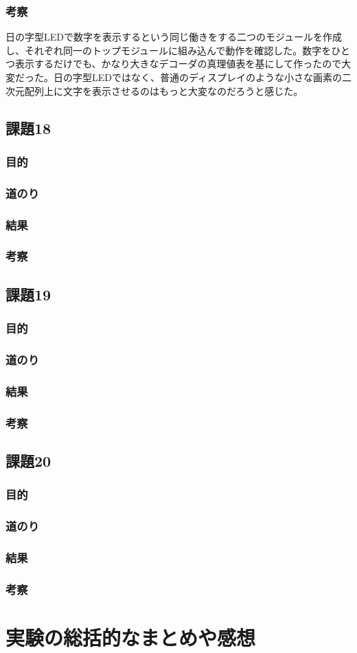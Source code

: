 \documentclass[a4paper]{jarticle}
\begin{document}
\subsubsection{考察}
日の字型LEDで数字を表示するという同じ働きをする二つのモジュールを作成し、それぞれ同一のトップモジュールに組み込んで動作を確認した。数字をひとつ表示するだけでも、かなり大きなデコーダの真理値表を基にして作ったので大変だった。日の字型LEDではなく、普通のディスプレイのような小さな画素の二次元配列上に文字を表示させるのはもっと大変なのだろうと感じた。
\subsection{課題18}
\subsubsection{目的}
\subsubsection{道のり}
\subsubsection{結果}
\subsubsection{考察}
\subsection{課題19}
\subsubsection{目的}
\subsubsection{道のり}
\subsubsection{結果}
\subsubsection{考察}
\subsection{課題20}
\subsubsection{目的}
\subsubsection{道のり}
\subsubsection{結果}
\subsubsection{考察}
\section{実験の総括的なまとめや感想}
\end{document}
